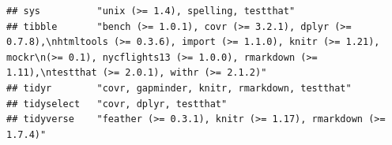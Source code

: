 \documentclass[]{article}
\begin{document}
\begin{verbatim}
## sys          "unix (>= 1.4), spelling, testthat"                                                                                                                                                                                                                                                                                                                                                                                                                                                                                                                                                       
## tibble       "bench (>= 1.0.1), covr (>= 3.2.1), dplyr (>= 0.7.8),\nhtmltools (>= 0.3.6), import (>= 1.1.0), knitr (>= 1.21), mockr\n(>= 0.1), nycflights13 (>= 1.0.0), rmarkdown (>= 1.11),\ntestthat (>= 2.0.1), withr (>= 2.1.2)"                                                                                                                                                                                                                                                                                                                                                                   
## tidyr        "covr, gapminder, knitr, rmarkdown, testthat"                                                                                                                                                                                                                                                                                                                                                                                                                                                                                                                                             
## tidyselect   "covr, dplyr, testthat"                                                                                                                                                                                                                                                                                                                                                                                                                                                                                                                                                                   
## tidyverse    "feather (>= 0.3.1), knitr (>= 1.17), rmarkdown (>= 1.7.4)"                                                                                                                                                                                                                                                                                                                                                                                                                                                                                                                               

\end{verbatim}
\end{document}
